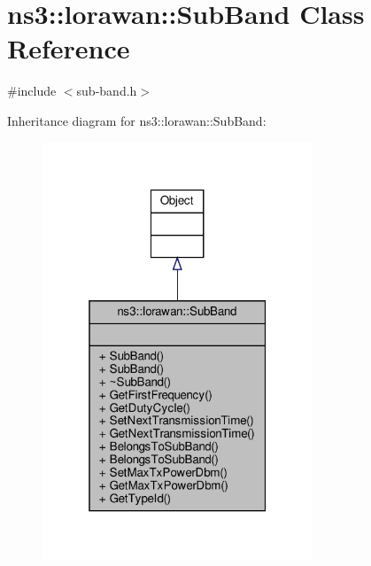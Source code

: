 \hypertarget{classns3_1_1lorawan_1_1SubBand}{}\section{ns3\+:\+:lorawan\+:\+:Sub\+Band Class Reference}
\label{classns3_1_1lorawan_1_1SubBand}


{\ttfamily \#include $<$sub-\/band.\+h$>$}



Inheritance diagram for ns3\+:\+:lorawan\+:\+:Sub\+Band\+:
\nopagebreak
\begin{figure}[H]
\begin{center}
\leavevmode
\includegraphics[width=229pt]{classns3_1_1lorawan_1_1SubBand__inherit__graph}
\end{center}
\end{figure}


